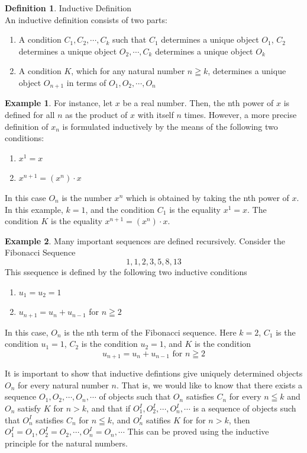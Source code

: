 \documentclass{book}
\theoremstyle{definition}
\newtheorem{definition}{Definition}[section]
\newtheorem{example}{Example}[definition]
\theoremstyle{remark}
\newcommand{\m}{\cdot}
\begin{document}
\begin{definition}
Inductive Definition \\

An inductive definition consists of two parts: 
    \begin{enumerate}
        \item A condition $C_1, C_2, \cdots, C_k$ such that $C_1$ determines a unique object $O_1$, $C_2$ determines a unique object $O_2, \cdots, C_k$ determines a unique object $O_k$
        \item A condition $K$, which for any natural number $n \geqq k$, determines a unique object $O_{n+1}$ in terms of $O_1, O_2, \cdots, O_n$
    \end{enumerate}
    
    \begin{example}
        For instance, let $x$ be a real number. Then, the nth power of $x$ is defined for all $n$ as the product of $x$ with itself $n$ times. However, a more precise definition of $x_n$ is formulated inductively by the means of the following two conditions:
            \begin{enumerate}
                \item $x^1 = x$
                \item $x^{n+1} = (x^n) \m x$
            \end{enumerate}
        In this case $O_n$ is the number $x^n$ which is obtained by taking the nth power of $x$. In this example, $k=1$, and the condition $C_1$ is the equality $x^1 = x$. The condition $K$ is the equality $x^{n+1} = (x^n) \m x$. \\
    \end{example}
\bigskip
    \begin{example}
        Many important sequences are defined recursively. Consider the Fibonacci Sequence $$ 1, 1, 2, 3, 5, 8, 13 $$
        This ssequence is defined by the following two inductive conditions
            \begin{enumerate}
                \item $u_1 = u_2 = 1$
                \item $u_{n+1} = u_n + u_{n-1}$ for $n \geqq 2$
            \end{enumerate}
        In this case, $O_n$ is the nth term of the Fibonacci sequence. Here $k=2$, $C_1$ is the condition $u_1 = 1$, $C_2$ is the condition $u_2 =1$, and $K$ is the condition $$ u_{n+1} = u_n + u_{n-1} \text{ for } n \geqq 2 $$
    \end{example}
It is important to show that inductive defintions give uniquely determined objects $O_n$ for every natural number $n$. That is, we would like to know that there exists a sequence $O_1, O_2, \cdots, O_n, \cdots$ of objects such that $O_n$ satisfies $C_n$ for every $n \leqq k$ and $O_n$ satisfy $K$ for $n > k$, 
and that if $O_1^I, O_2^I, \cdots, O_n^I, \cdots$ is a sequence of objects such that $O_n^I$ satisfies $C_n$ for $n \leqq k$, and $O_n^I$ satifies $K$ for for $n > k$, then $O_1^I=O_1, O_2^I=O_2, \cdots, O_n^I=O_n, \cdots$ This can be proved using the inductive principle for the natural numbers. 


\end{definition}
\end{document}
